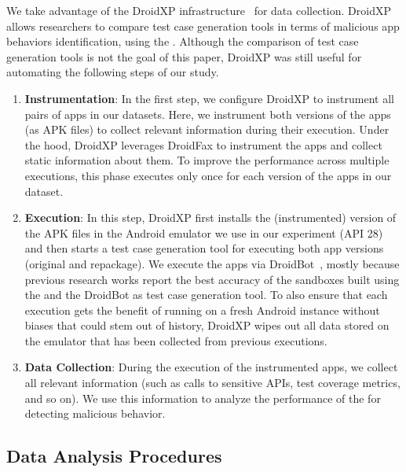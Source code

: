 We take advantage of the DroidXP infrastructure~\cite{DBLP:conf/scam/CostaMCMVBC20}
for data collection. DroidXP allows researchers to compare 
test case generation tools in terms of malicious app behaviors identification, using the \mas. Although the comparison of test
case generation tools is not the goal of this paper, DroidXP
was still useful for automating the following steps of our study.


\begin{enumerate}[S1]
 \item \textbf{Instrumentation}: In the first step,
we configure DroidXP to instrument all pairs of apps in our datasets.
Here, we instrument both versions of the apps (as APK files) to collect relevant information during their execution. Under the hood, DroidXP leverages
DroidFax to instrument the apps and collect static
information about them. To improve the performance across multiple executions,
this phase executes only once for each version of the apps in our dataset.

\item \textbf{Execution}: In this step, DroidXP first installs the (instrumented) version of the APK files in the Android emulator we use in our experiment (API 28) and then starts a test case generation tool for executing both app versions (original and repackage). We execute the apps via DroidBot~\cite{DBLP:conf/icse/LiYGC17}, mostly because previous research works report the best accuracy of the sandboxes built using the \mas and the DroidBot as test case generation tool. To also ensure that each execution gets the benefit of running on a fresh Android instance without biases that could stem out of history, DroidXP wipes out all data stored on the emulator that has been collected from previous executions.


\item \textbf{Data Collection}: During the execution of the instrumented apps, we collect all relevant information (such as calls to sensitive APIs, test coverage metrics, and so on). We use this information to analyze the performance of the \mas for detecting malicious behavior.
\end{enumerate}

\subsection{Data Analysis Procedures} \label{sec:dataAnalysisProc}



